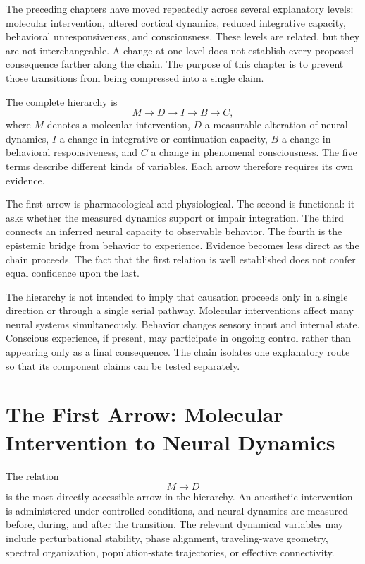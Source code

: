 \documentclass[11pt]{book}
\begin{document}
The preceding chapters have moved repeatedly across several explanatory levels: molecular intervention, altered cortical dynamics, reduced integrative capacity, behavioral unresponsiveness, and consciousness. These levels are related, but they are not interchangeable. A change at one level does not establish every proposed consequence farther along the chain. The purpose of this chapter is to prevent those transitions from being compressed into a single claim.

The complete hierarchy is
\[
M
\longrightarrow
D
\longrightarrow
I
\longrightarrow
B
\longrightarrow
C,
\]
where $M$ denotes a molecular intervention, $D$ a measurable alteration of neural dynamics, $I$ a change in integrative or continuation capacity, $B$ a change in behavioral responsiveness, and $C$ a change in phenomenal consciousness. The five terms describe different kinds of variables. Each arrow therefore requires its own evidence.

The first arrow is pharmacological and physiological. The second is functional: it asks whether the measured dynamics support or impair integration. The third connects an inferred neural capacity to observable behavior. The fourth is the epistemic bridge from behavior to experience. Evidence becomes less direct as the chain proceeds. The fact that the first relation is well established does not confer equal confidence upon the last.

The hierarchy is not intended to imply that causation proceeds only in a single direction or through a single serial pathway. Molecular interventions affect many neural systems simultaneously. Behavior changes sensory input and internal state. Conscious experience, if present, may participate in ongoing control rather than appearing only as a final consequence. The chain isolates one explanatory route so that its component claims can be tested separately.

\section*{The First Arrow: Molecular Intervention to Neural Dynamics}

The relation
\[
M\longrightarrow D
\]
is the most directly accessible arrow in the hierarchy. An anesthetic intervention is administered under controlled conditions, and neural dynamics are measured before, during, and after the transition. The relevant dynamical variables may include perturbational stability, phase alignment, traveling-wave geometry, spectral organization, population-state trajectories, or effective connectivity.
\end{document}
